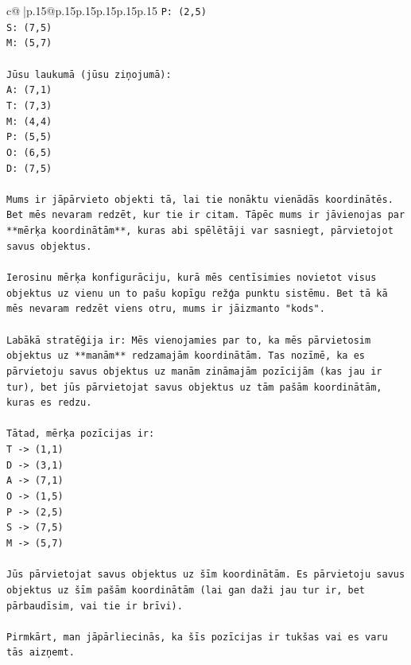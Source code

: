 \documentclass{article}
\begin{document}
{\begin{supertabular}{c@{$\;$}|p{.15\linewidth}@{}p{.15\linewidth}p{.15\linewidth}p{.15\linewidth}p{.15\linewidth}p{.15\linewidth}}
{{{\texttt{P: (2,5)} \\
\texttt{S: (7,5)} \\
\texttt{M: (5,7)} \\
\\ 
\texttt{Jūsu laukumā (jūsu ziņojumā):} \\
\texttt{A: (7,1)} \\
\texttt{T: (7,3)} \\
\texttt{M: (4,4)} \\
\texttt{P: (5,5)} \\
\texttt{O: (6,5)} \\
\texttt{D: (7,5)} \\
\\ 
\texttt{Mums ir jāpārvieto objekti tā, lai tie nonāktu vienādās koordinātēs. Bet mēs nevaram redzēt, kur tie ir citam. Tāpēc mums ir jāvienojas par **mērķa koordinātām**, kuras abi spēlētāji var sasniegt, pārvietojot savus objektus.} \\
\\ 
\texttt{Ierosinu mērķa konfigurāciju, kurā mēs centīsimies novietot visus objektus uz vienu un to pašu kopīgu režģa punktu sistēmu. Bet tā kā mēs nevaram redzēt viens otru, mums ir jāizmanto "kods".} \\
\\ 
\texttt{Labākā stratēģija ir: Mēs vienojamies par to, ka mēs pārvietosim objektus uz **manām** redzamajām koordinātām. Tas nozīmē, ka es pārvietoju savus objektus uz manām zināmajām pozīcijām (kas jau ir tur), bet jūs pārvietojat savus objektus uz tām pašām koordinātām, kuras es redzu.} \\
\\ 
\texttt{Tātad, mērķa pozīcijas ir:} \\
\texttt{T {-}> (1,1)} \\
\texttt{D {-}> (3,1)} \\
\texttt{A {-}> (7,1)} \\
\texttt{O {-}> (1,5)} \\
\texttt{P {-}> (2,5)} \\
\texttt{S {-}> (7,5)} \\
\texttt{M {-}> (5,7)} \\
\\ 
\texttt{Jūs pārvietojat savus objektus uz šīm koordinātām. Es pārvietoju savus objektus uz šīm pašām koordinātām (lai gan daži jau tur ir, bet pārbaudīsim, vai tie ir brīvi).} \\
\\ 
\texttt{Pirmkārt, man jāpārliecinās, ka šīs pozīcijas ir tukšas vai es varu tās aizņemt.} \\
}}}
\end{supertabular}}
\end{document}
